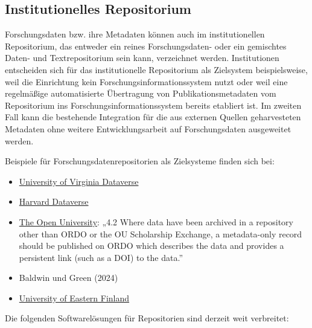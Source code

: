 \documentclass[
  ngerman,
  letterpaper,
  DIV=11]{scrreprt}
\providecommand{\tightlist}{%
  \setlength{\itemsep}{0pt}\setlength{\parskip}{0pt}}
\begin{document}
\subsection{Institutionelles
Repositorium}\label{institutionelles-repositorium}

Forschungsdaten bzw. ihre Metadaten können auch im institutionellen
Repositorium, das entweder ein reines Forschungsdaten- oder ein
gemischtes Daten- und Textrepositorium sein kann, verzeichnet werden.
Institutionen entscheiden sich für das institutionelle Repositorium als
Zielsystem beispielsweise, weil die Einrichtung kein
Forschungsinformationssystem nutzt oder weil eine regelmäßige
automatisierte Übertragung von Publikationsmetadaten vom Repositorium
ins Forschungsinformationssystem bereits etabliert ist. Im zweiten Fall
kann die bestehende Integration für die aus externen Quellen
geharvesteten Metadaten ohne weitere Entwicklungsarbeit auf
Forschungsdaten ausgeweitet werden.

Beispiele für Forschungsdatenrepositorien als Zielsysteme finden sich
bei:

\begin{itemize}
\tightlist
\item
  \href{https://dataverse.lib.virginia.edu/dataverse/libradata?q=&fq2=metadataSource\%3A\%5C\%22Harvested\%5C\%22&fq0=subtreePaths\%3A\%5C\%22\%2F1\%5C\%22&fq1=dvObjectType\%3A\%28dataverses+OR+datasets\%29&types=dataverses\%3Adatasets&sort=dateSort&order=}{University
  of Virginia Dataverse}
\item
  \href{https://dataverse.harvard.edu/dataverse/harvard;jsessionid=3945204ee9c13b5ef80975f097f4?q=&fq1=metadataSource\%3A\%5C\%22Harvested\%5C\%22&fq0=dvObjectType\%3A\%28dataverses+OR+datasets\%29&types=dataverses\%3Adatasets&sort=dateSort&order=}{Harvard
  Dataverse}
\item
  \href{https://university.open.ac.uk/library-research-support/research-data-management/open-university-research-data-management-policy}{The
  Open University}: „4.2 Where data have been archived in a repository
  other than ORDO or the OU Scholarship Exchange, a metadata-only record
  should be published on ORDO which describes the data and provides a
  persistent link (such as a DOI) to the data.''
\item
  Baldwin und Green (2024)
\item
  \href{https://www.uef.fi/en/open-research-data}{University of Eastern
  Finland}
\end{itemize}

Die folgenden Softwarelösungen für Repositorien sind derzeit weit
verbreitet:
\end{document}
